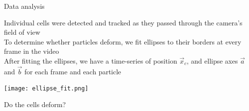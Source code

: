 
\begin{frame}[c]{Data analysis}

	Individual cells were detected and tracked as they passed through the camera's field of view \\
	To determine whether particles deform, we fit ellipses to their borders at every frame in the video \\
	After fitting the ellipses, we have a time-series of position $\vec{x}_{c}$, and ellipse axes $\vec{a}$ and $\vec{b}$ for each frame and each particle
	
	\texttt{[image: ellipse\_fit.png]}
	
\end{frame}


\begin{frame}[c]{Do the cells deform?}

	{\centering
		 \\
		\par
	}

	
\end{frame}




